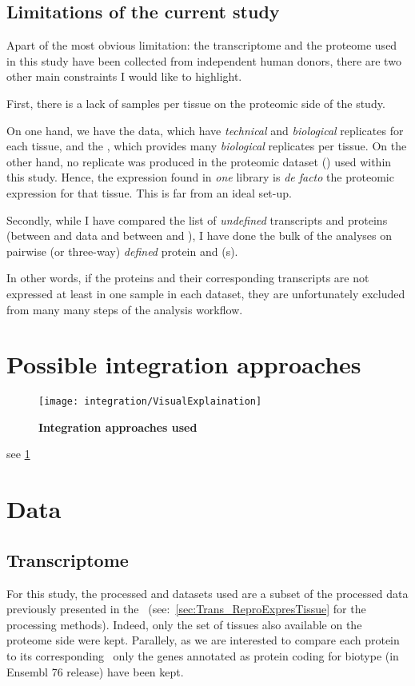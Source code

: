 \subsection{Limitations of the current study}
Apart of the most obvious limitation: the transcriptome and the proteome used in
this study have been collected from independent human donors, there are
two other main constraints I would like to highlight.

First, there is a lack of samples per tissue on the proteomic side of the study.

On one hand, we have the  data, which have \emph{technical}
and \emph{biological} replicates for each tissue, and the , which
provides many \emph{biological} replicates per tissue. On the other hand, no
replicate was produced in the proteomic dataset () used
within this study. Hence, the expression found in \emph{one} library is
\textit{de facto} the proteomic expression for that tissue. This
is far from an ideal set-up.

Secondly, while I have compared the list of \emph{undefined} transcripts and
proteins (between  and  data and
between  and ), I have done the bulk of the
analyses on pairwise (or three-way) \emph{defined} protein and \mRNA(s).

In other words, if the proteins and their corresponding transcripts are not
expressed at least in one sample in each dataset, they are unfortunately excluded
from many many steps of the analysis workflow.

\section{Possible integration approaches}
\label{sec:IntegrationPossibleApproaches}

\begin{figure}[!htbp]
    \texttt{[image: integration/VisualExplaination]}\centering
    \caption[Integration approaches used]{\label{fig:visualexp}\textbf{Integration
    approaches used}
    }
\end{figure}
see \cref{fig:visualexp}

\section{Data}
\label{sec:IntegrationData}

\subsection{Transcriptome}
For this study, the processed  and  datasets
used are a subset of the processed data previously presented in
the~ (see:~\cref{sec:Trans_ReproExpresTissue}
for the processing methods). Indeed, only the set of tissues also available
on the proteome side were kept. Parallely, as we are interested to compare each
protein to its corresponding \mRNA\, only the genes annotated as protein coding
for biotype (in Ensembl 76 release) have been kept.

